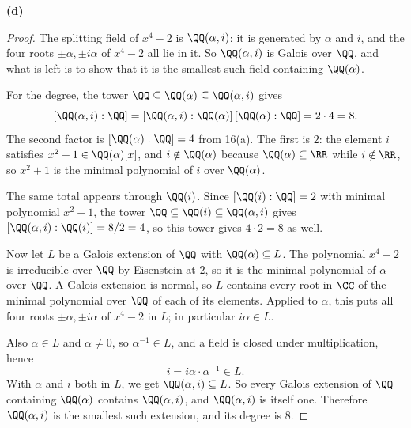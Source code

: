 \documentclass[11pt]{article}
\begin{document}
\noindent\textbf{(d)}
\begin{proof}
The splitting field of $x^{4}-2$ is $\QQ(\alpha,i)$: it is generated by $\alpha$ and $i$, and the four roots $\pm\alpha,\pm i\alpha$ of $x^{4}-2$ all lie in it. So $\QQ(\alpha,i)$ is Galois over $\QQ$, and what is left is to show that it is the smallest such field containing $\QQ(\alpha)$.

For the degree, the tower $\QQ\subseteq\QQ(\alpha)\subseteq\QQ(\alpha,i)$ gives
\[
[\QQ(\alpha,i):\QQ]=[\QQ(\alpha,i):\QQ(\alpha)]\,[\QQ(\alpha):\QQ]=2\cdot4=8.
\]
The second factor is $[\QQ(\alpha):\QQ]=4$ from 16(a). The first is $2$: the element $i$ satisfies $x^{2}+1\in\QQ(\alpha)[x]$, and $i\notin\QQ(\alpha)$ because $\QQ(\alpha)\subseteq\RR$ while $i\notin\RR$, so $x^{2}+1$ is the minimal polynomial of $i$ over $\QQ(\alpha)$.

The same total appears through $\QQ(i)$. Since $[\QQ(i):\QQ]=2$ with minimal polynomial $x^{2}+1$, the tower $\QQ\subseteq\QQ(i)\subseteq\QQ(\alpha,i)$ gives $[\QQ(\alpha,i):\QQ(i)]=8/2=4$, so this tower gives $4\cdot2=8$ as well.

Now let $L$ be a Galois extension of $\QQ$ with $\QQ(\alpha)\subseteq L$. The polynomial $x^{4}-2$ is irreducible over $\QQ$ by Eisenstein at $2$, so it is the minimal polynomial of $\alpha$ over $\QQ$. A Galois extension is normal, so $L$ contains every root in $\CC$ of the minimal polynomial over $\QQ$ of each of its elements. Applied to $\alpha$, this puts all four roots $\pm\alpha,\pm i\alpha$ of $x^{4}-2$ in $L$; in particular $i\alpha\in L$.

Also $\alpha\in L$ and $\alpha\ne0$, so $\alpha^{-1}\in L$, and a field is closed under multiplication, hence
\[
i=i\alpha\cdot\alpha^{-1}\in L.
\]
With $\alpha$ and $i$ both in $L$, we get $\QQ(\alpha,i)\subseteq L$. So every Galois extension of $\QQ$ containing $\QQ(\alpha)$ contains $\QQ(\alpha,i)$, and $\QQ(\alpha,i)$ is itself one. Therefore $\QQ(\alpha,i)$ is the smallest such extension, and its degree is $8$.
\end{proof}
\end{document}
